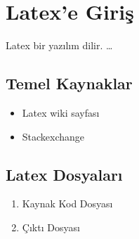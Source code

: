 \documentclass[a4paper, 12pt]{article}
\begin{document}
	\tableofcontents	
	\section{Latex'e Giriş}
	Latex bir yazılım dilir. \ldots \pagebreak
	\subsection{Temel Kaynaklar}
	\begin{itemize}
		\item Latex wiki sayfası
		\item Stackexchange
	\end{itemize}
	\subsection{Latex Dosyaları}
	\begin{enumerate}
		\item Kaynak Kod Dosyası
		\item Çıktı Dosyası
	\end{enumerate}
\end{document}
